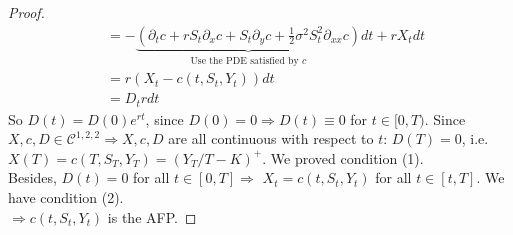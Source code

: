 \documentclass[a4paper, 10pt]{article}
\theoremstyle{definition}
\theoremstyle{hSol}
\begin{document}
\begin{proof}
\begin{equation}
\begin{split}
		&=-\underbrace{\left(\partial_t c+ rS_t\partial_x c + S_t\partial_y c+\frac{1}{2}\sigma^2 S_t^2 \partial_{xx}c\right)}_{\text{Use the PDE satisfied by~}c}dt + rX_t dt \\
		&= r(X_t - c(t,S_t,Y_t)) dt \\
		&= D_t rdt
	\end{split}
\end{equation}
So $D(t) = D(0) e^{rt}$, since $D(0)=0 \Rightarrow D(t)\equiv 0$ for $t \in [0,T)$. Since $X,c,D\in \mathcal{C}^{1,2,2} \Rightarrow X,c,D$ are all continuous with respect to $t$: $D(T)=0$, i.e. $X(T)=c(T,S_T,Y_T)=(Y_T/T-K)^+$. We proved condition (1).\\
Besides, $D(t)=0$ for all $t\in[0,T] \Rightarrow $ $X_t = c(t,S_t,Y_t)$ for all $t\in[t,T]$. We have condition (2).\\
$\Rightarrow c(t,S_t,Y_t)$ is the AFP.

\end{proof}
\end{document}
